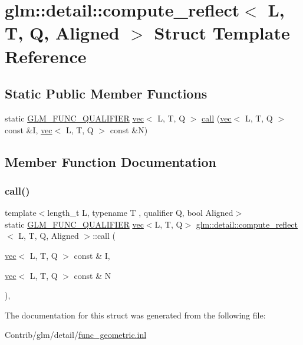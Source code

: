 \hypertarget{structglm_1_1detail_1_1compute__reflect}{}\section{glm\+:\+:detail\+:\+:compute\+\_\+reflect$<$ L, T, Q, Aligned $>$ Struct Template Reference}
\label{structglm_1_1detail_1_1compute__reflect}
\subsection*{Static Public Member Functions}
\begin{DoxyCompactItemize}
\item 
static \mbox{\hyperlink{setup_8hpp_a33fdea6f91c5f834105f7415e2a64407}{G\+L\+M\+\_\+\+F\+U\+N\+C\+\_\+\+Q\+U\+A\+L\+I\+F\+I\+ER}} \mbox{\hyperlink{structglm_1_1vec}{vec}}$<$ L, T, Q $>$ \mbox{\hyperlink{structglm_1_1detail_1_1compute__reflect_a2f96de0f0e05a3587f4430941e71cd31}{call}} (\mbox{\hyperlink{structglm_1_1vec}{vec}}$<$ L, T, Q $>$ const \&I, \mbox{\hyperlink{structglm_1_1vec}{vec}}$<$ L, T, Q $>$ const \&N)
\end{DoxyCompactItemize}


\subsection{Member Function Documentation}
\mbox{\label{structglm_1_1detail_1_1compute__reflect_a2f96de0f0e05a3587f4430941e71cd31}} 
\subsubsection{\texorpdfstring{call()}{call()}}
{\footnotesize\ttfamily template$<$length\+\_\+t L, typename T , qualifier Q, bool Aligned$>$ \\
static \mbox{\hyperlink{setup_8hpp_a33fdea6f91c5f834105f7415e2a64407}{G\+L\+M\+\_\+\+F\+U\+N\+C\+\_\+\+Q\+U\+A\+L\+I\+F\+I\+ER}} \mbox{\hyperlink{structglm_1_1vec}{vec}}$<$L, T, Q$>$ \mbox{\hyperlink{structglm_1_1detail_1_1compute__reflect}{glm\+::detail\+::compute\+\_\+reflect}}$<$ L, T, Q, Aligned $>$\+::call (\begin{DoxyParamCaption}\item[{\mbox{\hyperlink{structglm_1_1vec}{vec}}$<$ L, T, Q $>$ const \&}]{I,  }\item[{\mbox{\hyperlink{structglm_1_1vec}{vec}}$<$ L, T, Q $>$ const \&}]{N }\end{DoxyParamCaption})\hspace{0.3cm}{\ttfamily [inline]}, {\ttfamily [static]}}



The documentation for this struct was generated from the following file\+:\begin{DoxyCompactItemize}
\item 
Contrib/glm/detail/\mbox{\hyperlink{func__geometric_8inl}{func\+\_\+geometric.\+inl}}\end{DoxyCompactItemize}
